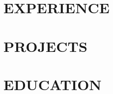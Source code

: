 \documentclass[letterpaper,11pt]{article}
\begin{document}



% 

\section{EXPERIENCE}
\resumeSubHeadingListStart




% 
% 
% 
% 
% 
% 

\resumeSubHeadingListEnd


\section{PROJECTS}


\resumeSubHeadingListStart
% 
% 
% 
% 


% 
% 
\resumeSubHeadingListEnd

\section {EDUCATION}
\resumeSubHeadingListStart




\resumeSubHeadingListEnd
\end{document}
